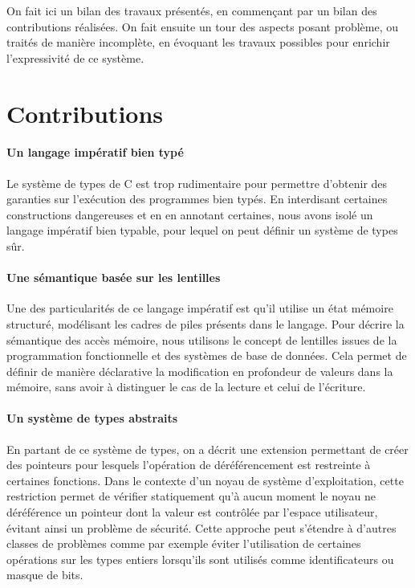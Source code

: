 On fait ici un bilan des travaux présentés, en commençant par un bilan des
contributions réalisées. On fait ensuite un tour des aspects posant problème, ou
traités de manière incomplète, en évoquant les travaux possibles pour enrichir
l'expressivité de ce système.



\section{Contributions}

\paragraph{Un langage impératif bien typé}

Le système de types de C est trop rudimentaire pour permettre d'obtenir des
garanties sur l'exécution des programmes bien typés. En interdisant certaines
constructions dangereuses et en en annotant certaines, nous avons isolé un
langage impératif bien typable, pour lequel on peut définir un système de types
sûr.

\paragraph{Une sémantique basée sur les lentilles}

Une des particularités de ce langage impératif est qu'il utilise un état mémoire
structuré, modélisant les cadres de piles présents dans le langage. Pour décrire
la sémantique des accès mémoire, nous utilisons le concept de lentilles issues
de la programmation fonctionnelle et des systèmes de base de données. Cela
permet de définir de manière déclarative la modification en profondeur de
valeurs dans la mémoire, sans avoir à distinguer le cas de la lecture et celui
de l'écriture.

\paragraph{Un système de types abstraits}

En partant de ce système de types, on a décrit une extension permettant de créer
des pointeurs pour lesquels l'opération de déréférencement est restreinte à
certaines fonctions. Dans le contexte d'un noyau de système d'exploitation,
cette restriction permet de vérifier statiquement qu'à aucun moment le noyau ne
déréférence un pointeur dont la valeur est contrôlée par l'espace utilisateur,
évitant ainsi un problème de sécurité. Cette approche peut s'étendre à d'autres
classes de problèmes comme par exemple éviter l'utilisation de certaines
opérations sur les types entiers lorsqu'ils sont utilisés comme identificateurs
ou masque de bits.

